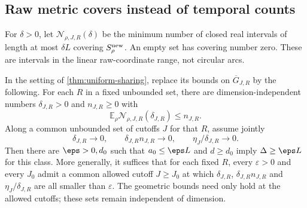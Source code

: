 \subsection{Raw metric covers instead of temporal counts}

For $\delta>0$, let $\mathcal N_{\rho,J,R}(\delta)$ be the minimum
number of closed real intervals of length at most $\delta L$ covering
$S^{\rm new}_\rho$. An empty set has covering number zero. These are
intervals in the linear raw-coordinate range, not circular arcs.

\begin{proposition}\label{prop:metric-sharing}
In the setting of \cref{thm:uniform-sharing}, replace its bounds on
$\overline G_{J,R}$ by the following. For each $R$ in a fixed unbounded
set, there are dimension-independent numbers $\delta_{J,R}>0$
and $n_{J,R}\ge0$ with
\[
 \mathbb E_\rho\mathcal N_{\rho,J,R}(\delta_{J,R})\le n_{J,R}.
\]
Along a common unbounded set of cutoffs $J$ for that $R$, assume jointly
\begin{equation}\label{eq:metric-sharing-limits}
 \delta_{J,R}\to0,\qquad
 \delta_{J,R}n_{J,R}\to0,\qquad
 \eta_J/\delta_{J,R}\to0.
\end{equation}
Then there are $\eps>0,d_0$ such that $a_0\le\eps L$ and $d\ge d_0$
imply $\Delta\ge\eps L$ for this class.
More generally, it suffices that for each fixed $R$, every $\varepsilon>0$
and every $J_0$ admit a common allowed cutoff $J\ge J_0$ at which
$\delta_{J,R}$, $\delta_{J,R}n_{J,R}$ and $\eta_J/\delta_{J,R}$ are
all smaller than $\varepsilon$. The geometric bounds need only hold at
the allowed cutoffs; these sets remain independent of dimension.
\end{proposition}
